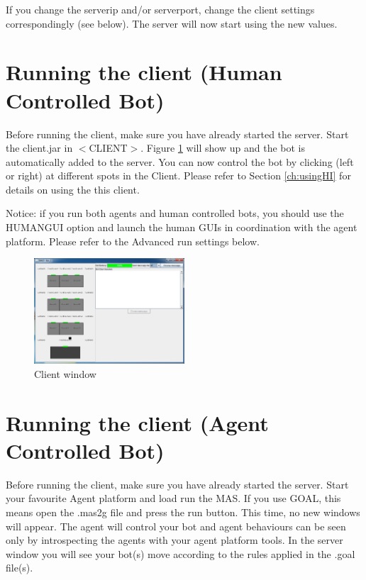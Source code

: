 \documentclass[11pt,a4paper]{article}
\begin{document}
If you change the serverip and/or serverport, change the client settings correspondingly (see below).
The server will now start using the new values.



\section{Running the client (Human Controlled Bot)}
Before running the client, make sure you have already started the server. Start the client.jar in $<$CLIENT$>$. Figure \ref{fig:Client} will show up and the bot is automatically added to the server. You can now control the bot by clicking (left or right) at different spots in the Client. Please refer to Section  \ref{ch:usingHI} for details on using the this client.

Notice: if you run both agents and human controlled bots, you should use the HUMANGUI option and launch the human GUIs in coordination with the agent platform. Please refer to the Advanced run settings below.

\begin{figure}[!h]
\begin{center}
  \includegraphics[width=0.5\textwidth]{client.png}
  \caption{Client window}\label{fig:Client}
\end{center}
\end{figure}


\section{Running the client (Agent Controlled Bot)}
Before running the client, make sure you have already started the server. Start your favourite Agent platform and load run the MAS. If you use GOAL, this means open the .mas2g file and press the run button. This time, no new windows will appear. The agent will control your bot and  agent behaviours can be seen only by introspecting the agents with your agent platform tools. In the server window you will see your bot(s) move according to the rules applied in the .goal file(s).
\end{document}
